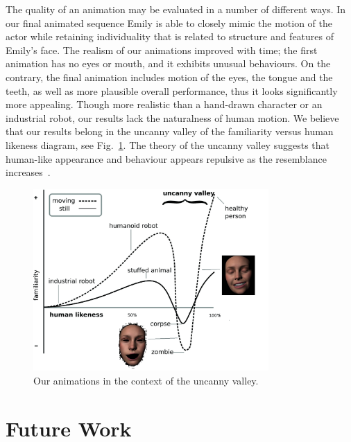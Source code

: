 \documentclass[11pt]{report}
\begin{document}
The quality of an animation may be evaluated in a number of different ways. In our final animated sequence Emily is able to closely mimic the motion of the actor while retaining individuality that is related to structure and features of Emily's face. The realism of our animations improved with time; the first animation has no eyes or mouth, and it exhibits unusual behaviours. On the contrary, the final animation includes motion of the eyes, the tongue and the teeth, as well as more plausible overall performance, thus it looks significantly more appealing. Though more realistic than a hand-drawn character or an industrial robot, our results lack the naturalness of human motion. We believe that our results belong in the uncanny valley of the familiarity versus human likeness diagram, see Fig.~\ref{fig:UV}. The theory of the uncanny valley suggests that human-like appearance and behaviour appears repulsive as the resemblance increases~\cite{UV}.
\begin{figure}[htbp!]
\centering
\includegraphics[width=0.8\textwidth]{img/UV}
	\caption{Our animations in the context of the uncanny valley.}
	\label{fig:UV}
\end{figure}



\section{Future Work}
\end{document}
